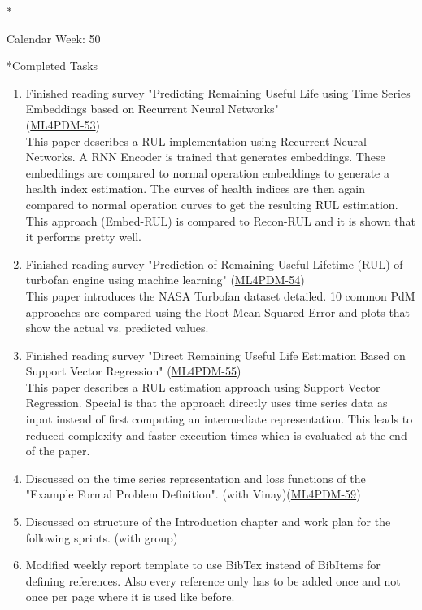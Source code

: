 \documentclass[11pt,a4paper]{article}
\begin{document}
\newpage
\begin{section}*{Calendar Week: 50 \hfill \date{11 December, 2020}}
 \begin{refsection}

   \begin{subsection}*{Completed Tasks}
     \begin{enumerate}
       \item
             Finished reading survey "Predicting Remaining Useful Life using Time Series Embeddings based on Recurrent Neural Networks" \cite{DBLP:journals/corr/abs-1709-01073}\\(\href{https://ml4pdm.atlassian.net/browse/ML4PDM-53}{ML4PDM-53})\\
             \phantom\quad This paper describes a RUL implementation using Recurrent Neural Networks. A RNN Encoder is trained that generates embeddings. These embeddings are compared to normal operation embeddings to generate a health index estimation. The curves of health indices are then again compared to normal operation curves to get the resulting RUL estimation. This approach (Embed-RUL) is compared to Recon-RUL and it is shown that it performs pretty well.
       \item
             Finished reading survey "Prediction of Remaining Useful Lifetime (RUL) of turbofan engine using machine learning" \cite{GSCH:mathew2017prediction} (\href{https://ml4pdm.atlassian.net/browse/ML4PDM-54}{ML4PDM-54})\\
             \phantom\quad This paper introduces the NASA Turbofan dataset detailed. 10 common PdM approaches are compared using the Root Mean Squared Error and plots that show the actual vs. predicted values.
       \item
             Finished reading survey "Direct Remaining Useful Life Estimation Based on Support Vector Regression" \cite{DBLP:journals/tie/KhelifCMLFZ17} (\href{https://ml4pdm.atlassian.net/browse/ML4PDM-55}{ML4PDM-55})\\
             \phantom\quad This paper describes a RUL estimation approach using Support Vector Regression. Special is that the approach directly uses time series data as input instead of first computing an intermediate representation. This leads to reduced complexity and faster execution times which is evaluated at the end of the paper.
       \item
             Discussed on the time series representation and loss functions of the "Example Formal Problem Definition". (with Vinay)(\href{https://ml4pdm.atlassian.net/browse/ML4PDM-59}{ML4PDM-59})
       \item
             Discussed on structure of the Introduction chapter and work plan for the following sprints. (with group)
       \item
             Modified weekly report template to use BibTex instead of BibItems for defining references. Also every reference only has to be added once and not once per page where it is used like before.
     \end{enumerate}
   \end{subsection}


\end{refsection}
\end{section}
\end{document}
